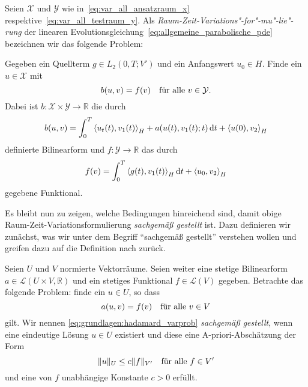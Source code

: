 \begin{Definition}
\label{definition:variationsformulierung}
    Seien $\mathcal X$ und $\mathcal Y$ wie in~\cref{eq:var_all_ansatzraum_x} respektive~\cref{eq:var_all_testraum_y}.
    Als \emph{Raum-Zeit-Variations"-for"-mu"-lie"-rung} der linearen Evolutionsgleichung~\cref{eq:allgemeine_parabolische_pde} bezeichnen wir das folgende Problem:

    Gegeben ein Quellterm $g \in L_{2}(0, T; V')$ und ein Anfangswert $u_{0} \in H$.
    Finde ein $u \in \mathcal X$ mit
    \begin{equation}
        \label{eq:var_all_problem}
        b(u, v) = f(v) \quad \fa v \in \mathcal Y.
    \end{equation}
    Dabei ist $b \colon \mathcal X \times \mathcal Y \to \mathbb{R}$ die durch
    \begin{equation}
        \label{eq:var_all_bf_b}
        b(u, v) = \int_{0}^{T} \skprod{u_{t}(t)}{v_{1}(t)}_{H} + a(u(t), v_{1}(t); t) \diff t + \skprod{u(0)}{v_{2}}_{H}
    \end{equation}
    definierte Bilinearform und $f \colon \mathcal Y \to \mathbb{R}$ das durch
    \begin{equation}
        \label{eq:var_all_f}
        f(v) = \int_{0}^{T} \skprod{g(t)}{v_{1}(t)}_{H} \diff t + \skprod{u_{0}}{v_{2}}_{H}
    \end{equation}
    gegebene Funktional.
\end{Definition}

Es bleibt nun zu zeigen, welche Bedingungen hinreichend sind, damit obige Raum-Zeit-Variationsformulierung \emph{sachgemäß gestellt} ist.
Dazu definieren wir zunächst, was wir unter dem Begriff \enquote{sachgemäß gestellt} verstehen wollen und greifen dazu auf die Definition nach \textcite{hadamard1902problemes} zurück.

\begin{Definition}
    Seien $U$ und $V$ normierte Vektorräume.
    Seien weiter eine stetige Bilinearform $a \in \mathcal L(U \times V, \mathbb{R})$ und ein stetiges Funktional $f \in \mathcal L(V)$ gegeben.
    Betrachte das folgende Problem: finde ein $u \in U$, so dass
    \begin{equation}
    \label{eq:grundlagen:hadamard_varprob}
        a(u, v) = f(v) \quad \fa v \in V
    \end{equation}
    gilt.
    Wir nennen \cref{eq:grundlagen:hadamard_varprob} \emph{sachgemäß gestellt}, wenn eine eindeutige Lösung $u \in U$ existiert und diese eine A-priori-Abschätzung der Form
    \begin{equation}
    \label{eq:grundlagen:hadamard_abschaetzung}
        \norm{u}_{U} \leq c \norm{f}_{V'} \quad \fa f \in V'
    \end{equation}
    und eine von $f$ unabhängige Konstante $c > 0$ erfüllt.
\end{Definition}

